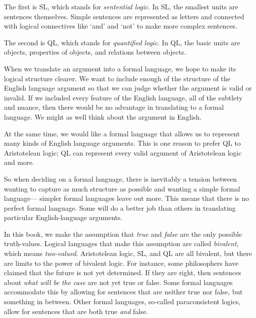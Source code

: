 The first is SL, which stands for \emph{sentential logic}. In SL, the smallest units are sentences themselves. Simple sentences are represented as letters and connected with {logical connectives} like `and' and `not' to make more complex sentences.

The second is QL, which stands for \emph{quantified logic}. In QL, the basic units are objects, properties of objects, and relations between objects.




When we translate an argument into a formal language, we hope to make its logical structure clearer. We want to include enough of the structure of the English language argument so that we can judge whether the argument is valid or invalid. If we included every feature of the English language, all of the subtlety and nuance, then there would be no advantage in translating to a formal language. We might as well think about the argument in English.

At the same time, we would like a formal language that allows us to represent many kinds of English language arguments. This is one reason to prefer QL to Aristotelean logic; QL can represent every valid argument of Aristotelean logic and more.

So when deciding on a formal language, there is inevitably a tension between wanting to capture as much structure as possible and wanting a simple formal language--- simpler formal languages leave out more. This means that there is no perfect formal language. Some will do a better job than others in translating particular English-language arguments.

In this book, we make the assumption that \emph{true} and \emph{false} are the only possible truth-values. Logical languages that make this assumption are called \emph{bivalent}, which means \emph{two-valued}. Aristotelean logic, SL, and QL are all bivalent, but there are limits to the power of bivalent logic. For instance, some philosophers have claimed that the future is not yet determined. If they are right, then sentences about \emph{what will be the case} are not yet true or false.
Some formal languages accommodate this by allowing for sentences that are neither true nor false, but something in between.
Other formal languages, so-called paraconsistent logics, allow for sentences that are both true \emph{and} false.

